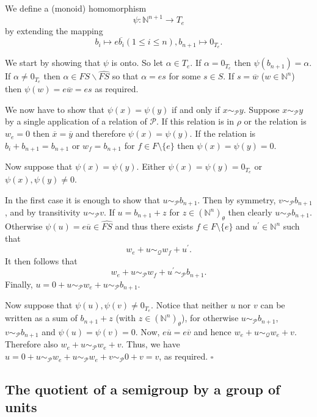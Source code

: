 \documentclass[12pt]{article}
\newenvironment{proof}{{\it Proof.\/}}{$\square$\\}
\begin{document}
\begin{proof}
We define a (monoid) homomorphism 
$$\psi: \mathbb{N}^{n+1}\rightarrow T_e$$
by extending the mapping
$$b_i\mapsto e\overline{b_i} (1\leq i\leq n), b_{n+1}\mapsto 0_{T_e}.$$

We start by showing that $\psi$ is onto. So let $\alpha\in T_e$.
If $\alpha=0_{T_e}$ then $\psi(b_{n+1})=\alpha$.
If $\alpha\neq 0_{T_e}$ then $\alpha\in FS\backslash\widehat{FS}$
so that $\alpha=es$ for some $s\in S$. If $s=\overline{w}$
($w\in\mathbb{N}^n$) then $\psi(w)=e\overline{w}=es$ as required.

We now have to show that $\psi(x)=\psi(y)$ if and only if
$x\sim_{\mathcal{P}}y$.
Suppose $x\sim_{\mathcal{P}}y$ by a single application of a
relation of $\mathcal{P}$. If this relation is in $\rho$ or the
relation is $w_e = 0$ then $\overline{x} = \overline{y}$ and
therefore $\psi(x) = \psi(y)$. If the relation is $b_i + b_{n+1} = b_{n+1}$ 
or $w_f = b_{n+1}$ for $f \in F \setminus \{e\}$ 
then $\psi(x) = \psi(y) = 0$. 

Now suppose that $\psi(x)=\psi(y)$.
Either $\psi(x)=\psi(y)=0_{T_e}$ or $\psi(x),\psi(y)\neq 0$.

In the first case it is enough to show that $u\sim_{\mathcal{P}}b_{n+1}$. Then
by symmetry, $v\sim_{\mathcal{P}}b_{n+1}$, and 
by transitivity $u \sim_\mathcal{P} v$. 
If $u=b_{n+1}+z$ for $z\in(\mathbb{N}^n)_{\theta}$ then
clearly $u\sim_{\mathcal{P}}b_{n+1}$.
Otherwise
$\psi(u)=e\overline{u}\in\widehat{FS}$
and thus there exists $f\in F\setminus\{e\}$ and $u^{\prime}\in\mathbb{N}^n$ 
such that
$$w_e+u\sim_{\mathcal{Q}}w_f+u^{\prime}.$$
It then follows that
$$w_e+u\sim_{\mathcal{P}}w_f+u^{\prime}\sim_{\mathcal{P}}b_{n+1}.$$
Finally, $u=0+u\sim_{\mathcal{P}}w_e+u\sim_{\mathcal{P}}b_{n+1}$.

Now suppose that $\psi(u),\psi(v)\neq 0_{T_e}$. 
Notice that neither $u$ nor $v$ can be written as a sum of
$b_{n+1}+z$ (with $z\in(\mathbb{N}^n)_{\theta}$), for otherwise
$u\sim_{\mathcal{P}}b_{n+1}$, $v\sim_{\mathcal{P}}b_{n+1}$
and $\psi(u)=\psi(v)=0$.
Now, $e\overline{u}=e\overline{v}$ and hence 
$w_e+u\sim_{\mathcal{Q}}w_e+v$.
Therefore also $w_e+u\sim_{\mathcal{P}}w_e+v$.
Thus, we have $u=0+u\sim_{\mathcal{P}}w_e+u\sim_{\mathcal{P}}
w_e+v\sim_{\mathcal{P}}0+v=v$,
as required.  
\end{proof}

\subsection{The quotient of a semigroup by a group of units}\label{s:unitquo}
\end{document}
